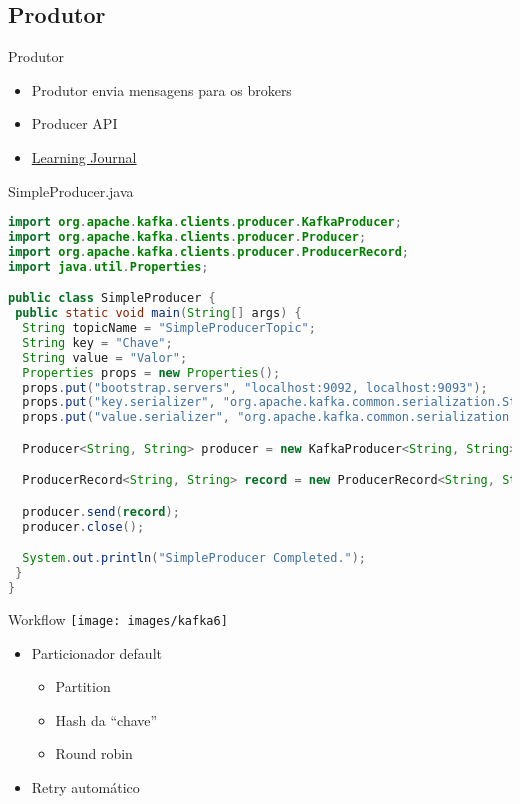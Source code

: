\subsection{Produtor}

\begin{frame}{Produtor}
\begin{itemize}
	\item Produtor envia mensagens para os brokers
	\item Producer API
	\item \href{https://github.com/LearningJournal/ApacheKafkaTutorials}{Learning Journal}
\end{itemize}
\end{frame}

\begin{frame}[fragile]{SimpleProducer.java}
\begin{lstlisting}[language=Java]
import org.apache.kafka.clients.producer.KafkaProducer;
import org.apache.kafka.clients.producer.Producer;
import org.apache.kafka.clients.producer.ProducerRecord;
import java.util.Properties;

public class SimpleProducer {
 public static void main(String[] args) {
  String topicName = "SimpleProducerTopic";
  String key = "Chave";
  String value = "Valor";
  Properties props = new Properties();
  props.put("bootstrap.servers", "localhost:9092, localhost:9093");
  props.put("key.serializer", "org.apache.kafka.common.serialization.StringSerializer");
  props.put("value.serializer", "org.apache.kafka.common.serialization.StringSerializer");

  Producer<String, String> producer = new KafkaProducer<String, String>(props);

  ProducerRecord<String, String> record = new ProducerRecord<String, String>(topicName, key, value);

  producer.send(record);
  producer.close();

  System.out.println("SimpleProducer Completed.");
 }
}

\end{lstlisting}
\end{frame}

\begin{frame}{Workflow}
\texttt{[image: images/kafka6]}

\begin{itemize}
	\item Particionador default
	\begin{itemize}
		\item Partition
		\item Hash da ``chave''
		\item Round robin
	\end{itemize}
	\item Retry automático
\end{itemize}
\end{frame}


